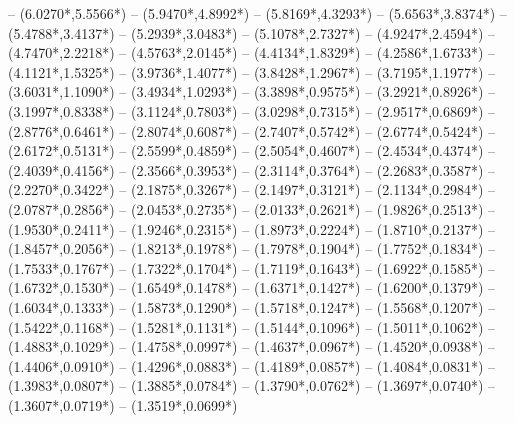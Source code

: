 {	-- ({6.0270*\dx},{5.5566*\dy})
	-- ({5.9470*\dx},{4.8992*\dy})
	-- ({5.8169*\dx},{4.3293*\dy})
	-- ({5.6563*\dx},{3.8374*\dy})
	-- ({5.4788*\dx},{3.4137*\dy})
	-- ({5.2939*\dx},{3.0483*\dy})
	-- ({5.1078*\dx},{2.7327*\dy})
	-- ({4.9247*\dx},{2.4594*\dy})
	-- ({4.7470*\dx},{2.2218*\dy})
	-- ({4.5763*\dx},{2.0145*\dy})
	-- ({4.4134*\dx},{1.8329*\dy})
	-- ({4.2586*\dx},{1.6733*\dy})
	-- ({4.1121*\dx},{1.5325*\dy})
	-- ({3.9736*\dx},{1.4077*\dy})
	-- ({3.8428*\dx},{1.2967*\dy})
	-- ({3.7195*\dx},{1.1977*\dy})
	-- ({3.6031*\dx},{1.1090*\dy})
	-- ({3.4934*\dx},{1.0293*\dy})
	-- ({3.3898*\dx},{0.9575*\dy})
	-- ({3.2921*\dx},{0.8926*\dy})
	-- ({3.1997*\dx},{0.8338*\dy})
	-- ({3.1124*\dx},{0.7803*\dy})
	-- ({3.0298*\dx},{0.7315*\dy})
	-- ({2.9517*\dx},{0.6869*\dy})
	-- ({2.8776*\dx},{0.6461*\dy})
	-- ({2.8074*\dx},{0.6087*\dy})
	-- ({2.7407*\dx},{0.5742*\dy})
	-- ({2.6774*\dx},{0.5424*\dy})
	-- ({2.6172*\dx},{0.5131*\dy})
	-- ({2.5599*\dx},{0.4859*\dy})
	-- ({2.5054*\dx},{0.4607*\dy})
	-- ({2.4534*\dx},{0.4374*\dy})
	-- ({2.4039*\dx},{0.4156*\dy})
	-- ({2.3566*\dx},{0.3953*\dy})
	-- ({2.3114*\dx},{0.3764*\dy})
	-- ({2.2683*\dx},{0.3587*\dy})
	-- ({2.2270*\dx},{0.3422*\dy})
	-- ({2.1875*\dx},{0.3267*\dy})
	-- ({2.1497*\dx},{0.3121*\dy})
	-- ({2.1134*\dx},{0.2984*\dy})
	-- ({2.0787*\dx},{0.2856*\dy})
	-- ({2.0453*\dx},{0.2735*\dy})
	-- ({2.0133*\dx},{0.2621*\dy})
	-- ({1.9826*\dx},{0.2513*\dy})
	-- ({1.9530*\dx},{0.2411*\dy})
	-- ({1.9246*\dx},{0.2315*\dy})
	-- ({1.8973*\dx},{0.2224*\dy})
	-- ({1.8710*\dx},{0.2137*\dy})
	-- ({1.8457*\dx},{0.2056*\dy})
	-- ({1.8213*\dx},{0.1978*\dy})
	-- ({1.7978*\dx},{0.1904*\dy})
	-- ({1.7752*\dx},{0.1834*\dy})
	-- ({1.7533*\dx},{0.1767*\dy})
	-- ({1.7322*\dx},{0.1704*\dy})
	-- ({1.7119*\dx},{0.1643*\dy})
	-- ({1.6922*\dx},{0.1585*\dy})
	-- ({1.6732*\dx},{0.1530*\dy})
	-- ({1.6549*\dx},{0.1478*\dy})
	-- ({1.6371*\dx},{0.1427*\dy})
	-- ({1.6200*\dx},{0.1379*\dy})
	-- ({1.6034*\dx},{0.1333*\dy})
	-- ({1.5873*\dx},{0.1290*\dy})
	-- ({1.5718*\dx},{0.1247*\dy})
	-- ({1.5568*\dx},{0.1207*\dy})
	-- ({1.5422*\dx},{0.1168*\dy})
	-- ({1.5281*\dx},{0.1131*\dy})
	-- ({1.5144*\dx},{0.1096*\dy})
	-- ({1.5011*\dx},{0.1062*\dy})
	-- ({1.4883*\dx},{0.1029*\dy})
	-- ({1.4758*\dx},{0.0997*\dy})
	-- ({1.4637*\dx},{0.0967*\dy})
	-- ({1.4520*\dx},{0.0938*\dy})
	-- ({1.4406*\dx},{0.0910*\dy})
	-- ({1.4296*\dx},{0.0883*\dy})
	-- ({1.4189*\dx},{0.0857*\dy})
	-- ({1.4084*\dx},{0.0831*\dy})
	-- ({1.3983*\dx},{0.0807*\dy})
	-- ({1.3885*\dx},{0.0784*\dy})
	-- ({1.3790*\dx},{0.0762*\dy})
	-- ({1.3697*\dx},{0.0740*\dy})
	-- ({1.3607*\dx},{0.0719*\dy})
	-- ({1.3519*\dx},{0.0699*\dy})
}
